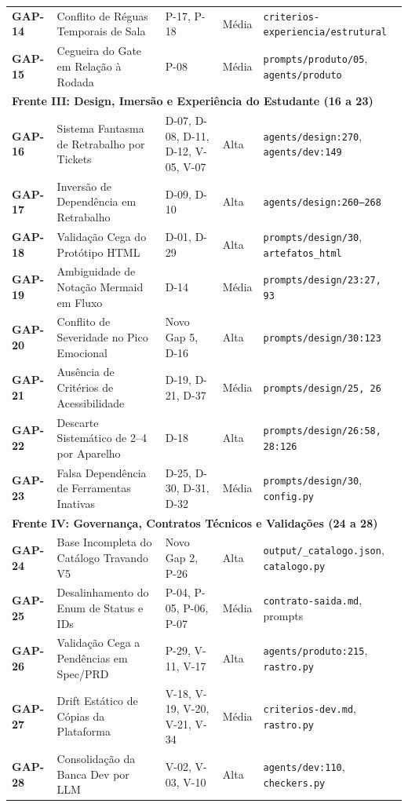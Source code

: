 \documentclass[11pt,a4paper]{article}
\begin{document}
\begin{longtable}{@{}p{1.2cm} p{5.5cm} p{2.2cm} p{1.3cm} p{5.2cm}@{}}
\textbf{GAP-14} & Conflito de Réguas Temporais de Sala & P-17, P-18 & Média & \texttt{criterios-experiencia/estrutural} \\
\textbf{GAP-15} & Cegueira do Gate em Relação à Rodada & P-08 & Média & \texttt{prompts/produto/05}, \texttt{agents/produto} \\
\midrule
\multicolumn{5}{l}{\textbf{\color{NavyBlue}Frente III: Design, Imersão e Experiência do Estudante (16 a 23)}} \\
\midrule
\textbf{GAP-16} & Sistema Fantasma de Retrabalho por Tickets & D-07, D-08, D-11, D-12, V-05, V-07 & Alta & \texttt{agents/design:270}, \texttt{agents/dev:149} \\
\textbf{GAP-17} & Inversão de Dependência em Retrabalho & D-09, D-10 & Alta & \texttt{agents/design:260--268} \\
\textbf{GAP-18} & Validação Cega do Protótipo HTML & D-01, D-29 & Alta & \texttt{prompts/design/30}, \texttt{artefatos\_html} \\
\textbf{GAP-19} & Ambiguidade de Notação Mermaid em Fluxo & D-14 & Média & \texttt{prompts/design/23:27, 93} \\
\textbf{GAP-20} & Conflito de Severidade no Pico Emocional & Novo Gap 5, D-16 & Alta & \texttt{prompts/design/30:123} \\
\textbf{GAP-21} & Ausência de Critérios de Acessibilidade & D-19, D-21, D-37 & Média & \texttt{prompts/design/25, 26} \\
\textbf{GAP-22} & Descarte Sistemático de 2--4 por Aparelho & D-18 & Alta & \texttt{prompts/design/26:58, 28:126} \\
\textbf{GAP-23} & Falsa Dependência de Ferramentas Inativas & D-25, D-30, D-31, D-32 & Média & \texttt{prompts/design/30}, \texttt{config.py} \\
\midrule
\multicolumn{5}{l}{\textbf{\color{NavyBlue}Frente IV: Governança, Contratos Técnicos e Validações (24 a 28)}} \\
\midrule
\textbf{GAP-24} & Base Incompleta do Catálogo Travando V5 & Novo Gap 2, P-26 & Alta & \texttt{output/\_catalogo.json}, \texttt{catalogo.py} \\
\textbf{GAP-25} & Desalinhamento do Enum de Status e IDs & P-04, P-05, P-06, P-07 & Média & \texttt{contrato-saida.md}, prompts \\
\textbf{GAP-26} & Validação Cega a Pendências em Spec/PRD & P-29, V-11, V-17 & Alta & \texttt{agents/produto:215}, \texttt{rastro.py} \\
\textbf{GAP-27} & Drift Estático de Cópias da Plataforma & V-18, V-19, V-20, V-21, V-34 & Média & \texttt{criterios-dev.md}, \texttt{rastro.py} \\
\textbf{GAP-28} & Consolidação da Banca Dev por LLM & V-02, V-03, V-10 & Alta & \texttt{agents/dev:110}, \texttt{checkers.py} \\
\end{longtable}
\normalsize
\end{document}
